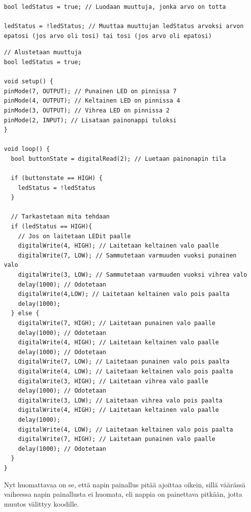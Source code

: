 \begin{tcolorbox}[colback=white,title=Vinkkejä Arduinolla koodaamiseen!,colbacktitle=purple!90]
\begin{lstlisting}
bool ledStatus = true; // Luodaan muuttuja, jonka arvo on totta

ledStatus = !ledStatus; // Muuttaa muuttujan ledStatus arvoksi arvon epatosi (jos arvo oli tosi) tai tosi (jos arvo oli epatosi)
\end{lstlisting}
\end{tcolorbox}

\begin{tcolorbox}[colback=yellow!10, title={Koodaa!},colbacktitle=orange,breakable]
\begin{solution}
\begin{lstlisting}
// Alustetaan muuttuja
bool ledStatus = true;

void setup() {
pinMode(7, OUTPUT); // Punainen LED on pinnissa 7
pinMode(4, OUTPUT); // Keltainen LED on pinnissa 4
pinMode(3, OUTPUT); // Vihrea LED on pinnissa 2
pinMode(2, INPUT); // Lisataan painonappi tuloksi
}

void loop() {
  bool buttonState = digitalRead(2); // Luetaan painonapin tila
  
  if (buttonstate == HIGH) {
    ledStatus = !ledStatus
  }
  
  // Tarkastetaan mita tehdaan
  if (ledStatus == HIGH){
    // Jos on laitetaan LEDit paalle
    digitalWrite(4, HIGH); // Laitetaan keltainen valo paalle
    digitalWrite(7, LOW); // Sammutetaan varmuuden vuoksi punainen valo
    digitalWrite(3, LOW); // Sammutetaan varmuuden vuoksi vihrea valo
    delay(1000); // Odotetaan
    digitalWrite(4,LOW); // Laitetaan keltainen valo pois paalta
    delay(1000);
  } else {
    digitalWrite(7, HIGH); // Laitetaan punainen valo paalle
    delay(1000); // Odotetaan
    digitalWrite(4, HIGH); // Laitetaan keltainen valo paalle
    delay(1000); // Odotetaan
    digitalWrite(7, LOW); // Laitetaan punainen valo pois paalta
    digitalWrite(4, LOW); // Laitetaan keltainen valo pois paalta
    digitalWrite(3, HIGH); // Laitetaan vihrea valo paalle
    delay(1000); // Odotetaan
    digitalWrite(3, LOW); // Laitetaan vihrea valo pois paalta
    digitalWrite(4, HIGH); // Laitetaan keltainen valo paalle
    delay(1000);
    digitalWrite(4, LOW); // Laitetaan keltainen valo pois paalta
    digitalWrite(7, HIGH); // Laitetaan punainen valo paalle
    delay(1000); // Odotetaan
  }
}
\end{lstlisting}

Nyt huomattavaa on se, että napin painallus pitää ajoittaa oikein, sillä väärässä vaiheessa napin painallusta ei huomata, eli nappia on painettava pitkään, jotta muutos välittyy koodille.
\end{solution}
\end{tcolorbox}

